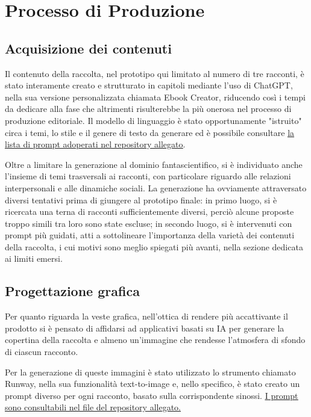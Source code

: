 \documentclass[a4paper,12pt]{article}
\begin{document}
\section*{Processo di Produzione}
\subsection*{Acquisizione dei contenuti}

Il contenuto della raccolta, nel prototipo qui limitato al numero di tre racconti, è stato interamente creato e strutturato in capitoli mediante l'uso di ChatGPT, nella sua versione personalizzata chiamata Ebook Creator, riducendo così i tempi da dedicare alla fase che altrimenti risulterebbe la più onerosa nel processo di produzione editoriale. Il modello di linguaggio è stato opportunamente "istruito" circa i temi, lo stile e il genere di testo da generare ed è possibile consultare \href{https://github.com/gianlucapironato/editoria_digitale/blob/main/prompt%20acquisizione%20contenuti.md}{\underline{la lista di prompt adoperati nel repository allegato}}.

\bigbreak

Oltre a limitare la generazione al dominio fantascientifico, si è individuato anche l'insieme di temi trasversali ai racconti, con particolare riguardo alle relazioni interpersonali e alle dinamiche sociali. La generazione ha ovviamente attraversato diversi tentativi prima di giungere al prototipo finale: in primo luogo, si è ricercata una terna di racconti sufficientemente diversi, perciò alcune proposte troppo simili tra loro sono state escluse; in secondo luogo, si è intervenuti con prompt più guidati, atti a sottolineare l'importanza della varietà dei contenuti della raccolta, i cui motivi sono meglio spiegati più avanti, nella sezione dedicata ai limiti emersi.

\subsection*{Progettazione grafica}
Per quanto riguarda la veste grafica, nell'ottica di rendere più accattivante il prodotto si è pensato di affidarsi ad applicativi basati su IA per generare la copertina della raccolta e almeno un'immagine che rendesse l'atmosfera di sfondo di ciascun racconto. 

\bigbreak

Per la generazione di queste immagini è stato utilizzato lo strumento chiamato Runway, nella sua funzionalità text-to-image e, nello specifico, è stato creato un prompt diverso per ogni racconto, basato sulla corrispondente sinossi. \href{https://github.com/gianlucapironato/editoria_digitale/blob/main/immagini/prompt%20immagini.md}{\underline{I prompt sono consultabili nel file del repository allegato.}}
\end{document}
